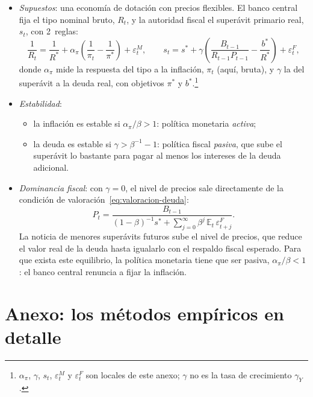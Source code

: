 \documentclass[11pt]{article}
\begin{document}
\begin{itemize}
\item \emph{Supuestos}: una economía de dotación con precios flexibles. El banco central fija el tipo nominal bruto, $R_t$, y la autoridad fiscal el superávit primario real, $s_t$, con 2~reglas\nocite{LeeperLeith2016Understanding}:
  \begin{equation*}
  \frac{1}{R_t}=\frac{1}{R^*}+\alpha_\pi\left(\frac{1}{\pi_t}-\frac{1}{\pi^*}\right)+\varepsilon^M_t,\qquad
  s_t=s^*+\gamma\left(\frac{B_{t-1}}{R_{t-1}P_{t-1}}-\frac{b^*}{R^*}\right)+\varepsilon^F_t ,
  \end{equation*}
  donde $\alpha_\pi$ mide la respuesta del tipo a la inflación, $\pi_t$ (aquí, bruta), y $\gamma$ la del superávit a la deuda real, con objetivos $\pi^*$ y $b^*$.\footnote{$\alpha_\pi$, $\gamma$, $s_t$, $\varepsilon^M_t$ y $\varepsilon^F_t$ son locales de este anexo; $\gamma$ no es la tasa de crecimiento $\gamma_Y$.}
\item \emph{Estabilidad}:
  \begin{itemize}
  \item la inflación es estable si $\alpha_\pi/\beta>1$: política monetaria \emph{activa};
  \item la deuda es estable si $\gamma>\beta^{-1}-1$: política fiscal \emph{pasiva}, que sube el superávit lo bastante para pagar al menos los intereses de la deuda adicional.
  \end{itemize}
\item \emph{Dominancia fiscal}: con $\gamma=0$, el nivel de precios sale directamente de la condición de valoración~\eqref{eq:valoracion-deuda}:
  \begin{equation*}
  P_t=\frac{B_{t-1}}{(1-\beta)^{-1}s^*+\sum_{j=0}^{\infty}\beta^{j}\,\mathbb{E}_t\,\varepsilon^F_{t+j}} .
  \end{equation*}
  La noticia de menores superávits futuros sube el nivel de precios, que reduce el valor real de la deuda hasta igualarlo con el respaldo fiscal esperado. Para que exista este equilibrio, la política monetaria tiene que ser pasiva, $\alpha_\pi/\beta<1$: el banco central renuncia a fijar la inflación. \findemo
\end{itemize}

\section{Anexo: los métodos empíricos en detalle}\label{anexo:metodos}
\end{document}
